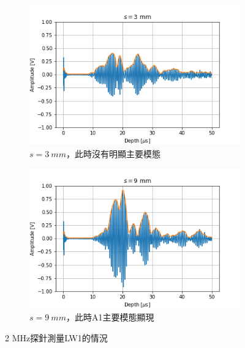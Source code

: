\documentclass[12pt]{report}
\begin{document}
\begin{figure}[htbp]
    \centering
    \begin{subfigure}{0.49\textwidth}
        \centering
        \includegraphics[width=\textwidth]{3.png}
        \caption{$s=\SI{3}{mm}$，此時沒有明顯主要模態}
        \label{fig:3mm}
    \end{subfigure}
    \hfill
    \begin{subfigure}{0.49\textwidth}
        \centering
        \includegraphics[width=\textwidth]{9.png}
        \caption{$s=\SI{9}{mm}$，此時A1主要模態顯現}
        \label{fig:9mm}
    \end{subfigure}
    \caption{2 MHz探針測量LW1的情況}
    \label{fig:2mhzlw1}
\end{figure}
\end{document}
